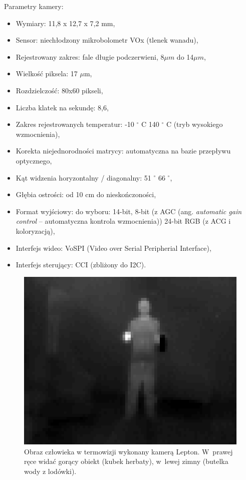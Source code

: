 Parametry kamery:
\begin{itemize}
\item Wymiary: 11,8 x 12,7 x 7,2 mm, 
\item Sensor: niechłodzony mikrobolometr VOx (tlenek wanadu),
\item Rejestrowany zakres: fale długie podczerwieni, 8$\mu m$ do 14$\mu m$,
\item Wielkość piksela: 17 $\mu$m,
\item Rozdzielczość: 80x60 pikseli,
\item Liczba klatek na sekundę: 8,6,  
\item Zakres rejestrowanych temperatur: -10  $^\circ$  C 140  $^\circ$  C (tryb wysokiego wzmocnienia),
\item Korekta niejednorodności matrycy: automatyczna na bazie przepływu optycznego, 
\item Kąt widzenia horyzontalny / diagonalny: 51 $^\circ$  66 $^\circ$,
\item Głębia ostrości: od 10 cm do nieskończoności,
\item Format wyjściowy: do wyboru: 14-bit, 8-bit (z AGC (ang. \textit{automatic gain control} -- automatyczna kontrola wzmocnienia)) 24-bit RGB (z ACG i koloryzacją),
\item Interfejs wideo: VoSPI (Video over Serial Peripherial Interface),
\item Interfejs sterujący: CCI (zbliżony do I2C).
\end{itemize}


\begin{figure}
\centering
\includegraphics[width=0.5\linewidth]{images/leptonTermalImage.png}
\caption[Obraz człowieka w~termowizji wykonany kamerą Lepton.]{Obraz człowieka w termowizji wykonany kamerą Lepton. W~prawej ręce widać gorący obiekt (kubek herbaty), w~lewej zimny (butelka wody z lodówki).}
\label{fig:leptonTermalImage}
\end{figure}



